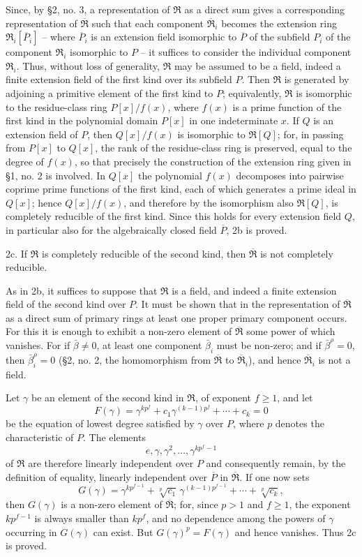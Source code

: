 \documentclass[11pt]{article}
\providecommand{\mR}{\mathfrak{R}}
\providecommand{\bR}{\overline{\mathfrak{R}}}
\providecommand{\bP}{\overline{P}}
\begin{document}
Since, by §2, no. 3, a representation of $\mR$ as a direct sum gives a corresponding representation of $\bR$ such that each component $\bR_i$ becomes the extension ring $\mR_i[\bP_i]$ -- where $\bP_i$ is an extension field isomorphic to $\bP$ of the subfield $P_i$ of the component $\mR_i$ isomorphic to $P$ -- it suffices to consider the individual component $\mR_i$. Thus, without loss of generality, $\mR$ may be assumed to be a field, indeed a finite extension field of the first kind over its subfield $P$. Then $\mR$ is generated by adjoining a primitive element of the first kind to $P$; equivalently, $\mR$ is isomorphic to the residue-class ring $P[x]/f(x)$, where $f(x)$ is a prime function of the first kind in the polynomial domain $P[x]$ in one indeterminate $x$. If $Q$ is an extension field of $P$, then $Q[x]/f(x)$ is isomorphic to $\mR[Q]$; for, in passing from $P[x]$ to $Q[x]$, the rank of the residue-class ring is preserved, equal to the degree of $f(x)$, so that precisely the construction of the extension ring given in §1, no. 2 is involved. In $Q[x]$ the polynomial $f(x)$ decomposes into pairwise coprime prime functions of the first kind, each of which generates a prime ideal in $Q[x]$; hence $Q[x]/f(x)$, and therefore by the isomorphism also $\mR[Q]$, is completely reducible of the first kind. Since this holds for every extension field $Q$, in particular also for the algebraically closed field $\bP$, 2b is proved.

2c. If $\mR$ is completely reducible of the second kind, then $\bR$ is not completely reducible.

As in 2b, it suffices to suppose that $\mR$ is a field, and indeed a finite extension field of the second kind over $P$. It must be shown that in the representation of $\bR$ as a direct sum of primary rings at least one proper primary component occurs. For this it is enough to exhibit a non-zero element of $\bR$ some power of which vanishes. For if $\bar\beta\ne0$, at least one component $\bar\beta_i$ must be non-zero; and if $\bar\beta^\rho=0$, then $\bar\beta_i^\rho=0$ (§2, no. 2, the homomorphism from $\bR$ to $\bR_i$), and hence $\bR_i$ is not a field.

Let $\gamma$ be an element of the second kind in $\mR$, of exponent $f\ge1$, and let
\[
        F(\gamma)=\gamma^{kp^f}+c_1\gamma^{(k-1)p^f}+\cdots+c_k=0
\]
be the equation of lowest degree satisfied by $\gamma$ over $P$, where $p$ denotes the characteristic of $P$. The elements
\[
        e,\gamma,\gamma^2,\ldots,\gamma^{kp^f-1}
\]
of $\mR$ are therefore linearly independent over $P$ and consequently remain, by the definition of equality, linearly independent over $\bP$ in $\bR$. If one now sets
\[
        G(\gamma)=\gamma^{kp^{f-1}}+\sqrt[p]{c_1}\,\gamma^{(k-1)p^{f-1}}+
        \cdots+\sqrt[p]{c_k},
\]
then $G(\gamma)$ is a non-zero element of $\bR$; for, since $p>1$ and $f\ge1$, the exponent $kp^{f-1}$ is always smaller than $kp^f$, and no dependence among the powers of $\gamma$ occurring in $G(\gamma)$ can exist. But $G(\gamma)^p=F(\gamma)$ and hence vanishes. Thus 2c is proved.
\end{document}
